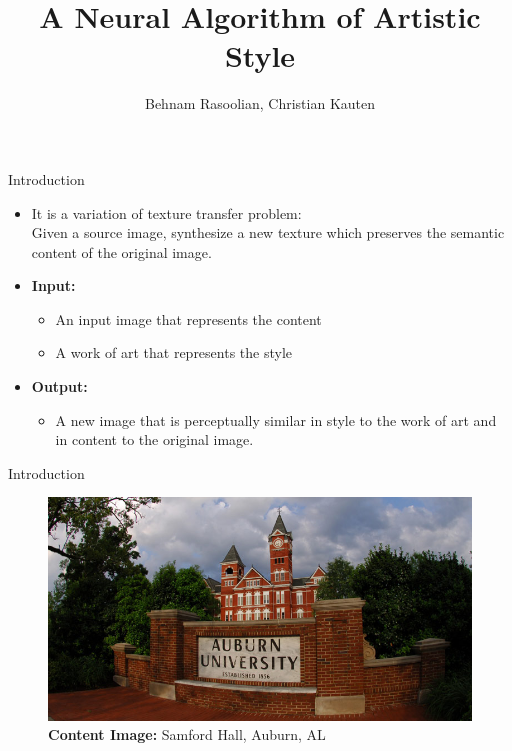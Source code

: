 \documentclass{beamer}
\title{A Neural Algorithm of Artistic Style \\ { \tiny \citeA{gatys2016image}}}
\author{Behnam Rasoolian, Christian Kauten}
\institute{Auburn University}
\date{}
\begin{document}



\frame{\titlepage}



\begin{frame}{Introduction}
    \begin{itemize}
    \item[] It is a variation of texture transfer problem:\\
    Given a source image, synthesize a new texture which preserves the
    semantic content of the original image.
    \item[] \textbf{Input:}
        \begin{itemize}
            \item An input image that represents the content
            \item A work of art that represents the style
        \end{itemize}
    \item[] \textbf{Output:}
        \begin{itemize}
            \item A new image that is perceptually similar in style to
            the work of art and in content to the original image.
        \end{itemize}
    \end{itemize}
\end{frame}



\begin{frame}{Introduction}
\begin{figure}[ht]
\centering
\includegraphics[width=\textwidth]{img/content/samford-sign}
\caption*{\textbf{Content Image:} Samford Hall, Auburn, AL}
\end{figure}
\end{frame}
\end{document}
